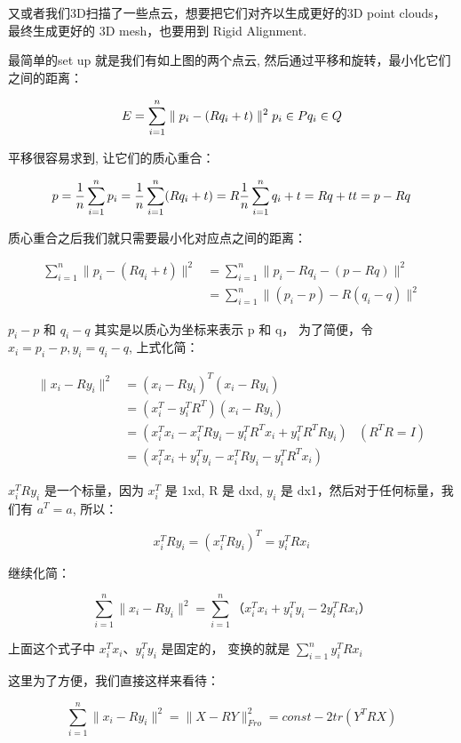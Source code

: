 \documentclass[
]{book}
\begin{document}
又或者我们3D扫描了一些点云，想要把它们对齐以生成更好的3D point clouds，最终生成更好的 3D mesh，也要用到 Rigid Alignment.

最简单的set up 就是我们有如上图的两个点云, 然后通过平移和旋转，最小化它们之间的距离：

\[
E  = \sum_{i=1}^n \parallel p_i-(Rq_i+  t) \parallel^2 \\
p_i \in P \\
q_i \in Q
\]

平移很容易求到, 让它们的质心重合：

\[
p = \frac{1}{n}\sum_{i=1}^np_i = \frac{1}{n}\sum_{i=1}^n (Rq_i+t) = R \frac{1}{n}\sum_{i=1}^nq_i + t = Rq + t \\
t = p - Rq
\]

质心重合之后我们就只需要最小化对应点之间的距离：

\[
\begin{aligned}
\sum_{i=1}^n \parallel p_i-(Rq_i+t) \parallel^2 &= \sum_{i=1}^n \parallel p_i - Rq_i - (p - Rq) \parallel^2 \\ 
    &= \sum_{i=1}^n \parallel (p_i -p) - R(q_i -q) \parallel^2
\end{aligned}
\]

\(p_i - p\) 和 \(q_i - q\) 其实是以质心为坐标来表示 p 和 q， 为了简便，令 \(x_i = p_i - p, y_i = q_i - q\), 上式化简：

\[
\begin{aligned}
 \parallel x_i - Ry_i \parallel ^2 &= (x_i - Ry_i)^T(x_i-Ry_i) \\ 
    &= (x_i^T - y_i^TR^T)(x_i-Ry_i) \\
    &= (x_i^Tx_i - x_i^TRy_i - y_i^TR^Tx_i + y_i^TR^TRy_i) & (R^TR = I)\\
    &= (x_i^Tx_i + y_i^Ty_i - x_i^TRy_i - y_i^TR^Tx_i)
\end{aligned}
\]

\(x_i^TRy_i\) 是一个标量，因为 \(x_i^T\) 是 1xd, R 是 dxd, \(y_i\) 是 dx1，然后对于任何标量，我们有 \(a^T = a\), 所以：

\[
x_i^TRy_i = (x_i^TRy_i)^T = y_i^TRx_i
\]

继续化简：

\[
\sum_{i=1}^n  \parallel  x_i - Ry_i \parallel^2 =\sum_{i=1}^n  （ x_i^Tx_i + y_i^Ty_i - 2y_i^TRx_i ）
\]

上面这个式子中 \(x_i^Tx_i、y_i^Ty_i\) 是固定的， 变换的就是 \(\sum_{i=1}^n y_i^TRx_i\)

这里为了方便，我们直接这样来看待：

\[
 \sum_{i=1}^n  \parallel  x_i - Ry_i \parallel^2 = \parallel  X - RY \parallel_{Fro}^2 = const - 2tr(Y^T R X)
\]
\end{document}
